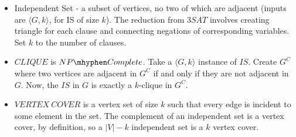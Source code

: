 \documentclass[twoside]{article}
\begin{document}
\begin{itemize}
	\item Independent Set - a subset of vertices, no two of which are adjacent (inputs are $\langle G,k\rangle$, for IS of size $k$).  The reduction from $3SAT$ involves creating triangle for each clause and connecting negations of corresponding variables.  Set $k$ to the number of clauses.
	
	\item $CLIQUE$ is $NP\mhyphen Complete$.  Take a $\langle G,k\rangle$ instance of $IS$.  Create $G^C$ where two vertices are adjacent in $G^C$ if and only if they are not adjacent in $G$.  Now, the $IS$ in $G$ is exactly a $k$-clique in $G^C$.
	
	\item $VERTEX\ COVER$ is a vertex set of size $k$ such that every edge is incident to some element in the set.  The complement of an independent set is a vertex cover, by definition, so a $|V|-k$ independent set is a $k$ vertex cover.
	
	
	
\end{itemize}
\end{document}
